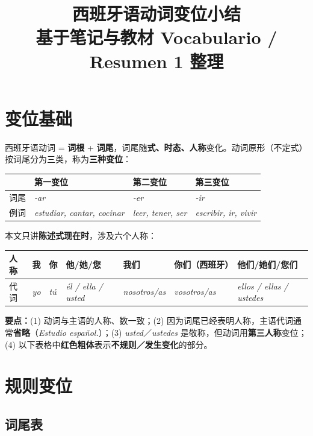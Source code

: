\documentclass[a4paper,11pt]{ctexart}
\title{\textbf{西班牙语动词变位小结}\\[2pt]\large 基于笔记与教材 Vocabulario / Resumen 1 整理}
\author{}
\date{}
\newcommand{\ir}[1]{\textbf{\textcolor{accent}{#1}}}
\newcommand{\es}[1]{\textit{#1}}
\begin{document}
\maketitle
\vspace{-2.2em}

\section{变位基础}

西班牙语动词 = \textbf{词根} + \textbf{词尾}，词尾随\textbf{式、时态、人称}变化。动词原形（不定式）按词尾分为三类，称为\textbf{三种变位}：

\begin{center}
\begin{tabular}{llll}
\toprule
 & 第一变位 & 第二变位 & 第三变位 \\
\midrule
词尾 & \es{-ar} & \es{-er} & \es{-ir} \\
例词 & \es{estudiar, cantar, cocinar} & \es{leer, tener, ser} & \es{escribir, ir, vivir} \\
\bottomrule
\end{tabular}
\end{center}

本文只讲\textbf{陈述式现在时}，涉及六个人称：

\begin{center}
\small
\begin{tabular}{@{}lllllll@{}}
\toprule
人称 & 我 & 你 & 他/她/您 & 我们 & 你们（西班牙） & 他们/她们/您们 \\
\midrule
代词 & \es{yo} & \es{tú} & \es{él / ella / usted} & \es{nosotros/as} & \es{vosotros/as} & \es{ellos / ellas / ustedes} \\
\bottomrule
\end{tabular}
\end{center}

\begin{tip}
\textbf{要点：}(1) 动词与主语的人称、数一致；(2) 因为词尾已经表明人称，主语代词通常\textbf{省略}（\es{Estudio español.}）；(3) \es{usted}／\es{ustedes} 是敬称，但动词用\textbf{第三人称}变位；(4) 以下表格中\ir{红色粗体}表示\textbf{不规则／发生变化}的部分。
\end{tip}

\section{规则变位}

\subsection{词尾表}
\end{document}
